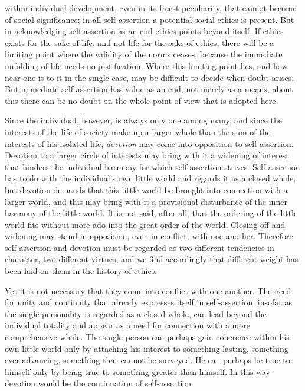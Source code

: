 \documentclass[12pt,a4paper,openany]{book}
\newcommand{\opage}[1]{\marginnote{\footnotesize\textit{[#1]}}}
\begin{document}
within individual development, even in its freest peculiarity, that cannot become of social significance; in all
self-assertion a potential social ethics is present. But in acknowledging self-assertion as an end ethics points
beyond itself. If ethics exists for the sake of life, and not life for the sake of ethics, there will be a
limiting point where the validity of the norms ceases, because the immediate unfolding of life needs no
justification. Where this limiting point lies, and how near one is to it in the single case, may be difficult
to
\opage{185}decide when doubt arises. But immediate self-assertion has value as an end, not merely as a means; about
this there can be no doubt on the whole point of view that is adopted here.

Since the individual, however, is always only one among many, and since the interests of the life of society
make up a larger whole than the sum of the interests of his isolated life, \textit{devotion} may come into
opposition to self-assertion. Devotion to a larger circle of interests may bring with it a widening of interest
that hinders the individual harmony for which self-assertion strives. Self-assertion has to do with the
individual's own little world and regards it as a closed whole, but devotion demands that this little world be
brought into connection with a larger world, and this may bring with it a provisional disturbance of the inner
harmony of the little world. It is not said, after all, that the ordering of the little world fits without more
ado into the great order of the world. Closing off and widening may stand in opposition, even in conflict, with
one another. Therefore self-assertion and devotion must be regarded as two different tendencies in character, two
different virtues, and we find accordingly that different weight has been laid on them in the history of ethics.

Yet it is not necessary that they come into conflict with one another. The need for unity and continuity that
already expresses itself in self-assertion, insofar as the single personality is regarded as a closed whole, can
lead beyond the individual totality and appear as a need for connection with a more comprehensive whole. The
single person can perhaps gain coherence within his own little world only by attaching his interest to something
lasting, something ever advancing, something that cannot be surveyed. He can perhaps be true to himself only by
being true to something greater than himself. In this way devotion would be the continuation of self-assertion.
\end{document}
